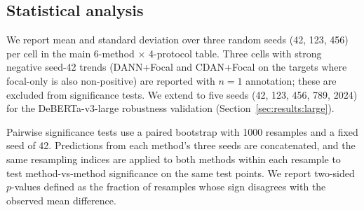 \subsection{Statistical analysis}
\label{sec:methods:stats}

We report mean and standard deviation over three random seeds (42, 123,
456) per cell in the main 6-method $\times$ 4-protocol table. Three
cells with strong negative seed-42 trends (DANN+Focal and CDAN+Focal
on the targets where focal-only is also non-positive) are reported with
$n{=}1$ annotation; these are excluded from significance tests.
We extend to five seeds (42, 123, 456, 789, 2024) for the
DeBERTa-v3-large robustness validation
(Section~\ref{sec:results:large}).

Pairwise significance tests use a paired bootstrap with 1000 resamples
and a fixed seed of 42. Predictions from each method's three seeds are
concatenated, and the same resampling indices are applied to both
methods within each resample to test method-vs-method significance on
the same test points. We report two-sided $p$-values defined as the
fraction of resamples whose sign disagrees with the observed mean
difference.
